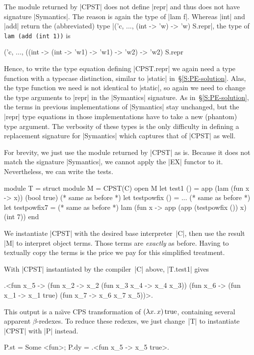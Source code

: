 The module returned by |CPST| does not define |repr|
and thus does not have signature |Symantics|.
The reason is again the type of |lam f|. Whereas
|int| and |add| return the (abbreviated) type
|('c, ..., (int -> 'w) -> 'w) S.repr|,
the type of \texttt{lam (add (int~1))} is
\begin{code}
('c, ..., ((int -> (int -> 'w1) -> 'w1) -> 'w2) -> 'w2) S.repr
\end{code}
Hence, to write the type equation defining |CPST.repr| we again need
a type function with a typecase distinction, similar to |static|
in~\S\ref{S:PE-solution}. Alas, the type function we need is not
identical to |static|, so again we need to change the type arguments to
|repr| in the |Symantics| signature. As in~\S\ref{S:PE-solution}, the
terms in previous implementations of |Symantics| stay unchanged, but the
|repr| type equations in those implementations have to take a new
(phantom) type argument.
The verbosity of these types is the only difficulty in defining a
replacement signature for |Symantics| which captures that of |CPST|
as well.

For brevity, we just
use the module returned by |CPST| as is. Because it does not
match the signature |Symantics|, we cannot apply the |EX| functor to it.
Nevertheless, we can write the tests.
\begin{code}
module T = struct
  module M = CPST(C)
  open M
  let test1 () =
       app (lam (fun x -> x)) (bool true)  (* same as before *)
  let testpowfix () = ...                  (* same as before *)
  let testpowfix7 =                        (* same as before *)
       lam (fun x -> app (app (testpowfix ()) x) (int 7))
end
\end{code}
We instantiate |CPST| with the desired base interpreter~|C|,
then use the result |M| to
interpret object terms. Those terms are \emph{exactly} as before.
Having to textually copy the terms is the
price we pay for this simplified treatment.
\begin{comment}
Our discussion of self\hyp interpretation in~\S\ref{selfinterp} shows
that this copying is not frivolous but represents plugging a term into
a context, which is one of the many faces of polymorphism.
\end{comment}

With 
|CPST| instantiated by the compiler~|C| above,
|T.test1| gives
\begin{code}
.<fun x_5 -> (fun x_2 -> x_2 (fun x_3 x_4 -> x_4 x_3))
             (fun x_6 -> (fun x_1 -> x_1 true)
                         (fun x_7 -> x_6 x_7 x_5))>.
\end{code}
This output is a na\"{\i}ve CPS transformation of $(\mathopen{\lambda\mathord{x}.\,}x)\mathinner{\mathrm{true}}$,
containing several apparent $\beta$-redexes.  To reduce these
redexes, we just change~|T| to instantiate |CPST| with |P| instead.
\begin{code}
{P.st = Some <fun>; P.dy = .<fun x_5 -> x_5 true>.}
\end{code}

